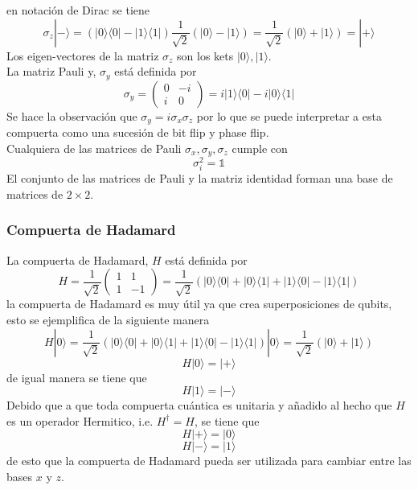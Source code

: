 \documentclass[a4paper]{article}
\begin{document}
en notación de Dirac se tiene
\begin{equation}
\sigma_z|-\rangle=(|0\rangle\langle 0|-|1\rangle\langle 1|)\frac{1}{\sqrt{2}}(|0\rangle-|1\rangle)=\frac{1}{\sqrt{2}}(|0\rangle+|1\rangle)=|+\rangle
\end{equation}
Los eigen-vectores de la matriz $\sigma_z$ son los kets $|0\rangle, |1\rangle$.\\
La matriz Pauli y, $\sigma_y$ está definida por
\begin{equation}
\sigma_y=
	\begin{pmatrix}
		0 &-i \\
		i & 0
	\end{pmatrix}=i|1\rangle\langle 0|-i|0\rangle\langle 1|
\end{equation}
Se hace la observación que $\sigma_y=i \sigma_x\sigma_z$ por lo que se puede interpretar a esta compuerta como una sucesión de bit flip y phase flip. \\
Cualquiera de las matrices de Pauli $\sigma_x, \sigma_y, \sigma_z$ cumple con 
\begin{equation}
\sigma_i^2=\mathbb{1}
\end{equation}
El conjunto de las matrices de Pauli y la matriz identidad forman una base de matrices de $2\times2$.
\subsubsection{Compuerta de Hadamard}
La compuerta de Hadamard, $H$ está definida por
\begin{equation}
	H=
	\frac{1}{\sqrt{2}}
	\begin{pmatrix}
		1 & 1 \\
		1 &-1
	\end{pmatrix}=\frac{1}{\sqrt{2}}(|0\rangle\langle 0|+|0\rangle\langle 1|+|1\rangle\langle 0|-|1\rangle\langle 1|)
\end{equation}
la compuerta de Hadamard es muy útil ya que crea superposiciones de qubits, esto se ejemplifica de la siguiente manera
\begin{equation}
H|0\rangle=\frac{1}{\sqrt{2}}(|0\rangle\langle 0|+|0\rangle\langle 1|+|1\rangle\langle 0|-|1\rangle\langle 1|)|0\rangle=\frac{1}{\sqrt{2}}(|0\rangle+|1\rangle)
\end{equation}
\begin{equation}
H|0\rangle=|+\rangle
\end{equation}
de igual manera se tiene que 
\begin{equation}
H|1\rangle=|-\rangle
\end{equation}
Debido que a que toda compuerta cuántica es unitaria y añadido al hecho que $H$ es un operador Hermitico, i.e. $H^\dagger=H$, se tiene que 
\begin{equation}
H|+\rangle=|0\rangle
\end{equation}
\begin{equation}
H|-\rangle=|1\rangle
\end{equation}
de esto que la compuerta de Hadamard pueda ser utilizada para cambiar entre las bases $x$ y $z$.
\end{document}
